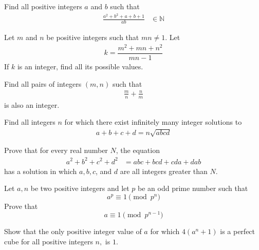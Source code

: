 \begin{problem} %
	Find all positive integers $a$ and $b$ such that
		\begin{align*}
		 \frac{a^2+b^2+a+b+1}{ab}
			 	& \in\mathbb{N}
		\end{align*}
\end{problem}

\begin{problem} %
	Let $m$ and $n$ be positive integers such that $mn \neq 1$. Let
		\begin{align*}
			k= \dfrac{m^2+mn+n^2}{mn-1}
		\end{align*}
	If $k$ is an integer, find all its possible values.
\end{problem}

\begin{problem}
	Find all pairs of integers $( m, n )$ such that
		\begin{align*}
		 \frac{ m } { n } + \frac{ n}{m}
		\end{align*}
	is also an integer.
\end{problem}

\begin{problem}[Vietnam 2002]
	Find all integers \(n\) for which there exist infinitely many integer solutions to
		\begin{align*}
			a + b + c + d = n \sqrt{ abcd }
		\end{align*}
\end{problem}

\begin{problem}[Putnam 1933]
	Prove that for every real number $N$, the equation
		\begin{align*}
			a^2 + b^2 + c^2 + d^2
				& = abc + bcd + cda + dab
		\end{align*}
	has a solution in which $a, b, c$, and $d$ are all integers greater than $N$.
\end{problem}

\begin{problem}
	Let $a,n$ be two positive integers and let $p$ be an odd prime number such that
	\[a^p \equiv 1 \pmod{p^n}\]
	Prove that
	\[a \equiv 1 \pmod{p^{n-1}}\]
\end{problem}

\begin{problem}
	Show that the only positive integer value of $a$ for which $4(a^n+1)$ is a perfect cube for all positive integers $n,$ is $1.$
\end{problem}

